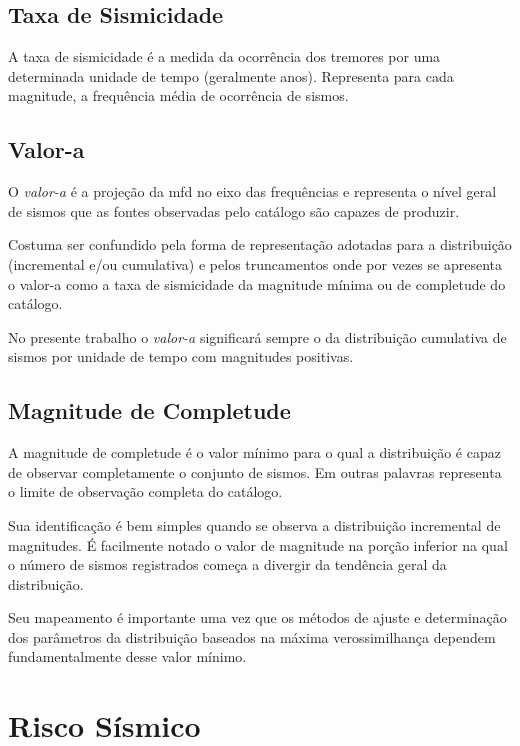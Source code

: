 \subsection{Taxa de Sismicidade}
\label{sec:seismic_rate}

A taxa de sismicidade é a medida da ocorrência dos tremores por uma determinada unidade de tempo (geralmente anos).
Representa para cada magnitude, a frequência média de ocorrência de sismos.

\subsection{Valor-a}
\label{sec:a_value}

O \emph{valor-a} é a projeção da \gls{mfd} no eixo das frequências e representa o nível geral de sismos
que as fontes observadas pelo catálogo são capazes de produzir.

Costuma ser confundido pela forma de representação adotadas para a distribuição (incremental e/ou
cumulativa) e pelos truncamentos onde por vezes se apresenta o valor-a como a taxa de sismicidade da 
magnitude mínima ou de completude do catálogo.

No presente trabalho o \emph{valor-a} significará sempre o da distribuição cumulativa de sismos por unidade de
tempo com magnitudes positivas.

\subsection{Magnitude de Completude}
\label{sec:completeness}

A magnitude de completude é o valor mínimo para o qual a distribuição é capaz de observar completamente o conjunto
de sismos. Em outras palavras representa o limite de observação completa do catálogo.

Sua identificação é bem simples quando se observa a distribuição incremental de magnitudes. É facilmente notado o valor
de magnitude na porção inferior na qual o número de sismos registrados começa a divergir da tendência geral da
distribuição.

Seu mapeamento é importante uma vez que os métodos de ajuste e determinação dos parâmetros da distribuição baseados na
máxima verossimilhança \citep{aki_1965, weichert_1980} dependem fundamentalmente desse valor mínimo.


\section{Risco Sísmico}
\label{sec:risco_sismico}

